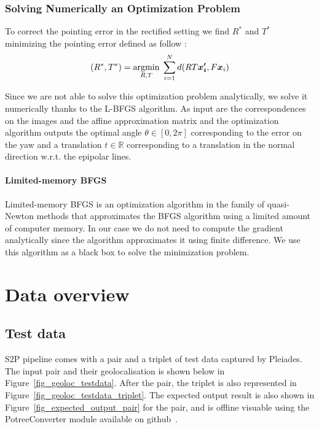 \documentclass[paper=a4, fontsize=11pt, onecolumn, tikz, dvipsnames, svgnames, x11names]{article}
\begin{document}
\subsubsection{Solving Numerically an Optimization Problem}
To correct the pointing error in the rectified setting we find $R^*$ and $T^*$ minimizing the pointing error defined as follow :
\begin{align}
    (R^*, T^*) = \underset{R,T}{\operatorname{argmin}}\; \sum_{i=1}^N d(RT\bm{x_i'}, F\bm{x}_i)
\end{align}

Since we are not able to solve this optimization problem analytically, we solve it numerically thanks to the L-BFGS algorithm. As input are the correspondences on the images and the affine approximation matrix and the optimization algorithm outputs the optimal angle $\theta \in [0, 2\pi]$ corresponding to the error on the yaw and a translation $t \in \mathbb{R}$ corresponding to a translation in the normal direction w.r.t. the epipolar lines.

\paragraph{Limited-memory BFGS\\}
Limited-memory BFGS is an optimization algorithm in the family of quasi-Newton methods that approximates the BFGS algorithm using a limited amount of computer memory. In our case we do not need to compute the gradient analytically since the algorithm approximates it using finite difference. We use this algorithm as a black box to solve the minimization problem.

\newpage
\section{Data overview}

\subsection{Test data}

S2P pipeline comes with a pair and a triplet of test data captured by Pleiades. The input pair and their geolocalisation is shown below in Figure~\ref{fig_geoloc_testdata}. After the pair, the triplet is also represented in Figure~\ref{fig_geoloc_testdata_triplet}. The expected output result is also shown in Figure~\ref{fig_expected_output_pair} for the pair, and is offline visuable using the PotreeConverter module available on github~\cite{PotreeConverter}.
\end{document}
